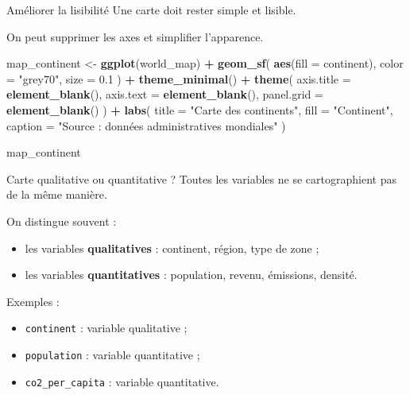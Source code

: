 \documentclass[
  10pt,
  ignorenonframetext,
]{beamer}
\newenvironment{Shaded}{\begin{snugshade}}{\end{snugshade}}
\newcommand{\AttributeTok}[1]{\textcolor[rgb]{0.13,0.29,0.53}{#1}}
\newcommand{\FloatTok}[1]{\textcolor[rgb]{0.00,0.00,0.81}{#1}}
\newcommand{\FunctionTok}[1]{\textcolor[rgb]{0.13,0.29,0.53}{\textbf{#1}}}
\newcommand{\NormalTok}[1]{#1}
\newcommand{\OtherTok}[1]{\textcolor[rgb]{0.56,0.35,0.01}{#1}}
\newcommand{\SpecialCharTok}[1]{\textcolor[rgb]{0.81,0.36,0.00}{\textbf{#1}}}
\newcommand{\StringTok}[1]{\textcolor[rgb]{0.31,0.60,0.02}{#1}}
\begin{document}
\begin{frame}[fragile]{Améliorer la lisibilité}
\label{amuxe9liorer-la-lisibilituxe9}
Une carte doit rester simple et lisible.

On peut supprimer les axes et simplifier l'apparence.

\begin{Shaded}
\begin{Highlighting}[]
\NormalTok{map\_continent }\OtherTok{\textless{}{-}} \FunctionTok{ggplot}\NormalTok{(world\_map) }\SpecialCharTok{+}
  \FunctionTok{geom\_sf}\NormalTok{(}
    \FunctionTok{aes}\NormalTok{(}\AttributeTok{fill =}\NormalTok{ continent),}
    \AttributeTok{color =} \StringTok{"grey70"}\NormalTok{,}
    \AttributeTok{size =} \FloatTok{0.1}
\NormalTok{  ) }\SpecialCharTok{+}
  \FunctionTok{theme\_minimal}\NormalTok{() }\SpecialCharTok{+}
  \FunctionTok{theme}\NormalTok{(}
    \AttributeTok{axis.title =} \FunctionTok{element\_blank}\NormalTok{(),}
    \AttributeTok{axis.text =} \FunctionTok{element\_blank}\NormalTok{(),}
    \AttributeTok{panel.grid =} \FunctionTok{element\_blank}\NormalTok{()}
\NormalTok{  ) }\SpecialCharTok{+}
  \FunctionTok{labs}\NormalTok{(}
    \AttributeTok{title =} \StringTok{"Carte des continents"}\NormalTok{,}
    \AttributeTok{fill =} \StringTok{"Continent"}\NormalTok{,}
    \AttributeTok{caption =} \StringTok{"Source : données administratives mondiales"}
\NormalTok{  )}

\NormalTok{map\_continent}
\end{Highlighting}
\end{Shaded}
\end{frame}

\begin{frame}{Carte qualitative ou quantitative ?}
\label{carte-qualitative-ou-quantitative}
Toutes les variables ne se cartographient pas de la même manière.

On distingue souvent :

\begin{itemize}
  \item les variables \textbf{qualitatives} : continent, région, type de zone ;
  \item les variables \textbf{quantitatives} : population, revenu, émissions, densité.
\end{itemize}

Exemples :

\begin{itemize}
  \item \texttt{continent} : variable qualitative ;
  \item \texttt{population} : variable quantitative ;
  \item \texttt{co2\_per\_capita} : variable quantitative.
\end{itemize}
\end{frame}
\end{document}
